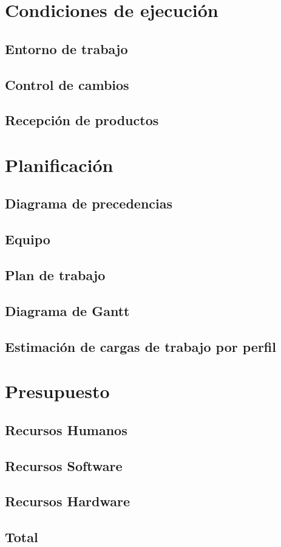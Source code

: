 \chapter{Condiciones de ejecución}

\section{Entorno de trabajo}

\section{Control de cambios}

\section{Recepción de productos}

\chapter{Planificación}

\section{Diagrama de precedencias}

\section{Equipo}

\section{Plan de trabajo}

\section{Diagrama de Gantt}

\section{Estimación de cargas de trabajo por perfil}

\chapter{Presupuesto}

\section{Recursos Humanos}

\section{Recursos Software}

\section{Recursos Hardware}

\section{Total}